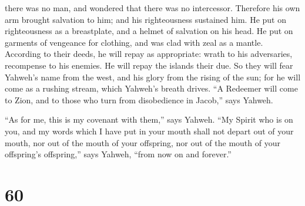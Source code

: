 there was no man, and wondered that there was no intercessor. Therefore
his own arm brought salvation to him; and his righteousness sustained
him.  He put on righteousness as a breastplate, and a
helmet of salvation on his head. He put on garments of vengeance for
clothing, and was clad with zeal as a mantle.  According to
their deeds, he will repay as appropriate: wrath to his adversaries,
recompense to his enemies. He will repay the islands their due.
 So they will fear Yahweh's name from the west, and his
glory from the rising of the sun; for he will come as a rushing stream,
which Yahweh's breath drives.  ``A Redeemer will come to
Zion, and to those who turn from disobedience in Jacob,'' says Yahweh.

 ``As for me, this is my covenant with them,'' says Yahweh.
``My Spirit who is on you, and my words which I have put in your mouth
shall not depart out of your mouth, nor out of the mouth of your
offspring, nor out of the mouth of your offspring's offspring,'' says
Yahweh, ``from now on and forever.''

\hypertarget{section-56}{%
\section{60}\label{section-56}}

